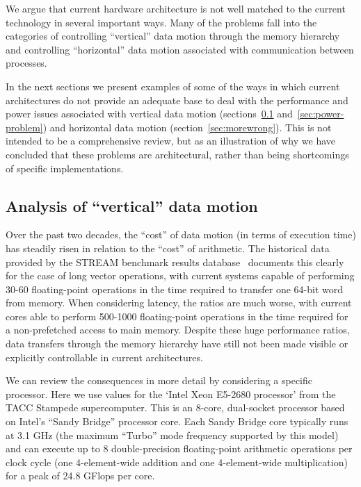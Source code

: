 We argue that current hardware architecture is not well matched
to the current technology in several important ways.   Many of the
problems fall into the categories of controlling ``vertical'' data motion 
through the memory hierarchy and controlling ``horizontal'' data motion
associated with communication between processes.

In the next sections we present examples of some of the ways in which
current architectures do not provide an adequate base to deal with the
performance and power issues associated with vertical data motion
(sections~\ref{sec:bw-problem} and~\ref{sec:power-problem}) and
horizontal data motion (section~\ref{sec:morewrong}).  This is not
intended to be a comprehensive review, but as an illustration of why
we have concluded that these problems are architectural, rather than
being shortcomings of specific implementations.

\subsection{Analysis of ``vertical'' data motion}%
\label{sec:bw-problem}

Over the past two decades, the ``cost'' of data motion (in terms of
execution time) has steadily risen in relation to the ``cost'' of
arithmetic.  The historical data provided by the STREAM benchmark
results database~\cite{STREAM} documents this clearly for the case of
long vector operations, with current systems capable of performing
30-60 floating-point operations in the time required to transfer one
64-bit word from memory.  When considering latency, the ratios are
much worse, with current cores able to perform 500-1000 floating-point
operations in the time required for a non-prefetched access to main
memory.  Despite these huge performance ratios, data transfers through
the memory hierarchy have still not been made visible or explicitly
controllable in current architectures.

We can review the consequences in more detail by considering a specific processor.  Here
we use values for the `Intel Xeon E5-2680 processor' from the TACC Stampede supercomputer.
This is an 8-core, dual-socket processor based on Intel's ``Sandy Bridge'' processor core.
Each Sandy Bridge core typically runs at 3.1 GHz (the maximum ``Turbo'' mode frequency
supported by this model) and can execute up to 8 double-precision floating-point 
arithmetic operations per clock cycle (one 4-element-wide addition and one 4-element-wide 
multiplication) for a peak of 24.8 GFlops per core.

